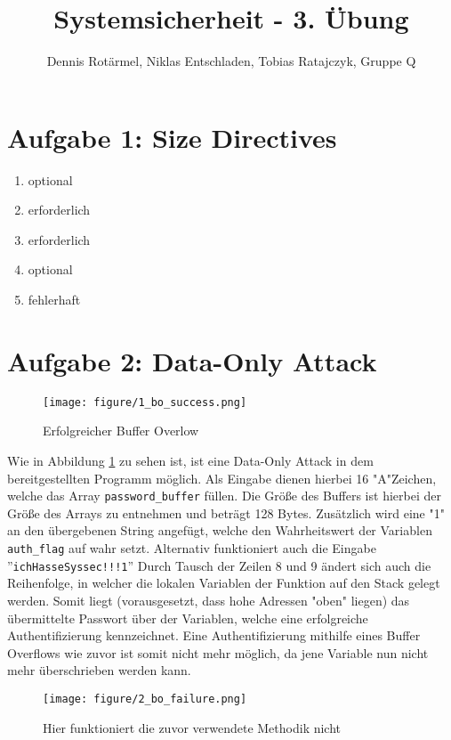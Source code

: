 \documentclass[]{scrreprt}
\title{Systemsicherheit - 3. Übung}
\author{Dennis Rotärmel, Niklas Entschladen, Tobias Ratajczyk, Gruppe Q}
\begin{document}
\maketitle

\newpage
\thispagestyle{empty}
\section*{Aufgabe 1: Size Directives}

\renewcommand{\labelenumi}{\alph{enumi})}
\begin{enumerate}
	\item optional
	\item erforderlich
	\item erforderlich
	\item optional
	\item fehlerhaft
\end{enumerate}
\section*{Aufgabe 2: Data-Only Attack}
\begin{figure}[h]
	\centering\texttt{[image: figure/1\_bo\_success.png]}
	\caption{\label{fig:bosuccess}Erfolgreicher Buffer Overlow}
\end{figure}
Wie in Abbildung \ref{fig:bosuccess} zu sehen ist, ist eine Data-Only Attack in dem bereitgestellten Programm möglich. Als Eingabe dienen hierbei 16 "{}A"{}Zeichen, welche das Array \verb|password_buffer| füllen. Die Größe des Buffers ist hierbei der Größe des Arrays zu entnehmen und beträgt 128 Bytes. Zusätzlich wird eine "{}1"{} an den übergebenen String angefügt, welche den Wahrheitswert der Variablen \verb|auth_flag| auf wahr setzt. Alternativ funktioniert auch die Eingabe ''\texttt{ichHasseSyssec!!!1}'' \newline
Durch Tausch der Zeilen 8 und 9 ändert sich auch die Reihenfolge, in welcher die lokalen Variablen der Funktion auf den Stack gelegt werden.
Somit liegt (vorausgesetzt, dass hohe Adressen "oben" liegen) das übermittelte Passwort über der Variablen, welche eine erfolgreiche Authentifizierung kennzeichnet.
Eine Authentifizierung mithilfe eines Buffer Overflows wie zuvor ist somit nicht mehr möglich, da jene Variable nun nicht mehr überschrieben werden kann. 
\begin{figure}[h]
	\centering\texttt{[image: figure/2\_bo\_failure.png]}
	\caption{Hier funktioniert die zuvor verwendete Methodik nicht}
\end{figure}
\end{document}
